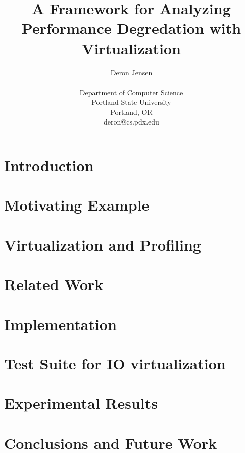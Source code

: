 \documentclass[10pt,twocolumn,oneside]{article}
\begin{document}
\title{A Framework for Analyzing Performance Degredation with Virtualization}
\author{Deron Jensen\\
\\
Department of Computer Science\\
Portland State University\\
Portland, OR \\
deron@cs.pdx.edu \\
}

\maketitle

\begin{abstract}
\end{abstract}

\section{Introduction}


\section{Motivating Example}


\section{Virtualization and Profiling}


\section{Related Work}


\section{Implementation}


\section{Test Suite for IO virtualization}


\section{Experimental Results}


\section{Conclusions and Future Work}


\end{document}
